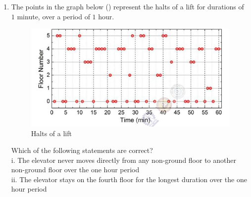\documentclass[journal,12pt,onecolumn]{IEEEtran}
\theoremstyle{remark}
\begin{document}
\begin{enumerate}
\item The points in the graph below () represent the halts of a lift for durations of $1$ minute, over a period of
$1$ hour. \par \hfill{}
\begin{figure}[H]
    \centering
    \includegraphics[width=0.7\columnwidth]{Figs/Q-65.png}
    \caption{Halts of a lift}
    \label{f-26}
\end{figure}

Which of the following statements are correct? \\
i. The elevator never moves directly from any non-ground floor to another non-ground floor over the one hour period\\
ii. The elevator stays on the fourth floor for the longest duration over the one hour period

\begin{enumerate}
\end{enumerate}


\end{enumerate}
\end{document}
